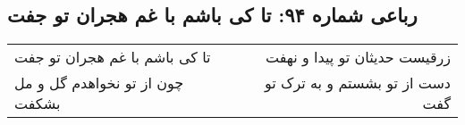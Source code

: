 \begin{center}
\section*{رباعی شماره ۹۴: تا کی باشم با غم هجران تو جفت}
\label{sec:sh094}
\begin{longtable}{l p{0.5cm} r}
تا کی باشم با غم هجران تو جفت
&&
زرقیست حدیثان تو پیدا و نهفت
\\
چون از تو نخواهدم گل و مل بشکفت
&&
دست از تو بشستم و به ترک تو گفت
\\
\end{longtable}
\end{center}
